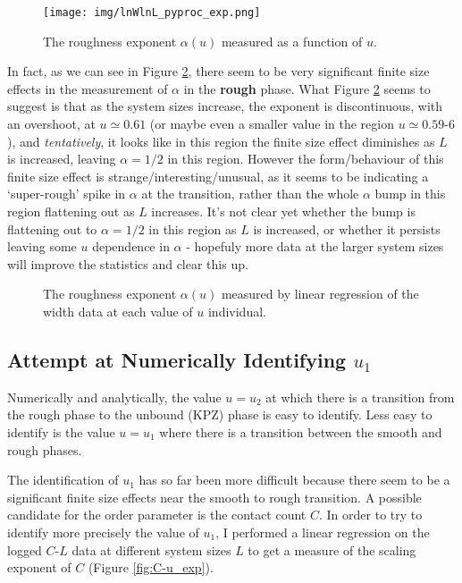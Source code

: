 \documentclass[a4paper,10pt]{article}
\newcommand{\fref}[1]{Figure \ref{#1}}
\begin{document}
\begin{figure}
  \centering
  \texttt{[image: img/lnWlnL\_pyproc\_exp.png]}
  \caption{The roughness exponent $\alpha(u)$ measured as a function of $u$.}
  \label{fig:alpha-u}
\end{figure}
In fact, as we can see in \fref{fig:W-u_4set}, there seem to be very significant finite size effects in the measurement of $\alpha$ in the {\bf rough} phase. What \fref{fig:W-u_4set} seems to suggest is that as the system sizes increase, the exponent is discontinuous, with an overshoot, at $u \simeq 0.61$ (or maybe even a smaller value in the region $u\simeq 0.59$-$6$), and \emph{tentatively}, it looks like in this region the finite size effect diminishes as $L$ is increased, leaving $\alpha = 1/2$ in this region. However the form/behaviour of this finite size effect is strange/interesting/unusual, as it seems to be indicating a `super-rough' spike in $\alpha$ at the transition, rather than the whole $\alpha$ bump in this region flattening out as $L$ increases. It's not clear yet whether the bump is flattening out to $\alpha = 1/2$ in this region as $L$ is increased, or whether it persists leaving some $u$ dependence in $\alpha$ - hopefuly more data at the larger system sizes will improve the statistics and clear this up.
\begin{figure}[h!]
 \centering
 \caption{The roughness exponent $\alpha(u)$ measured by linear regression of the width data at each value of $u$ individual.}
 \label{fig:W-u_4set}
\end{figure}

\subsection{Attempt at Numerically Identifying $u_1$}

Numerically and analytically, the value $u = u_2$ at which there is a transition from the rough phase to the unbound (KPZ) phase is easy to identify. Less easy to identify is the value $u = u_1$ where there is a transition between the smooth and rough phases.

The identification of $u_1$ has so far been more difficult because there seem to be a significant finite size effects near the smooth to rough transition. A possible candidate for the order parameter is the contact count $C$. In order to try to  identify more precisely the value of $u_1$, I performed a linear regression on the logged $C$-$L$ data at different system sizes $L$ to get a measure of the scaling exponent of $C$ (\fref{fig:C-u_exp}). 
\end{document}
